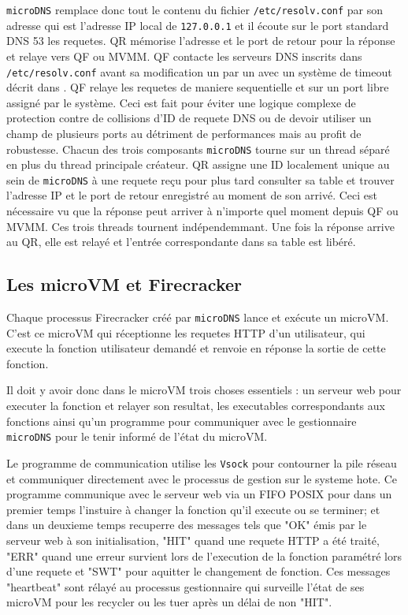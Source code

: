 \documentclass[12pt]{article}
\begin{document}
\texttt{microDNS} remplace donc tout le contenu du fichier \texttt{/etc/resolv.conf} par son adresse qui est l'adresse IP local de \texttt{127.0.0.1} et il écoute sur le port standard DNS 53 les requetes. QR mémorise l'adresse et le port de retour pour la réponse et relaye vers QF ou MVMM. QF contacte les serveurs DNS inscrits dans \texttt{/etc/resolv.conf} avant sa modification un par un avec un système de timeout décrit dans . QF relaye les requetes de maniere sequentielle et sur un port libre assigné par le système. Ceci est fait pour éviter une logique complexe de protection contre de collisions d'ID de requete DNS ou de devoir utiliser un champ de plusieurs ports au détriment de performances mais au profit de robustesse. Chacun des trois composants \texttt{microDNS} tourne sur un thread séparé en plus du thread principale créateur. QR assigne une ID localement unique au sein de \texttt{microDNS} à une requete reçu pour plus tard consulter sa table et trouver l'adresse IP et le port de retour enregistré au moment de son arrivé. Ceci est nécessaire vu que la réponse peut arriver à n'importe quel moment depuis QF ou MVMM. Ces trois threads tournent indépendemmant. Une fois la réponse arrive au QR, elle est relayé et l'entrée correspondante dans sa table est libéré.

\subsection{Les microVM et Firecracker}
Chaque processus Firecracker créé par \texttt{microDNS} lance et exécute un microVM. C'est ce microVM qui réceptionne les requetes HTTP d'un utilisateur, qui execute la fonction utilisateur demandé et renvoie en réponse la sortie de cette fonction.

Il doit y avoir donc dans le microVM trois choses essentiels : un serveur web pour executer la fonction et relayer son resultat, les executables correspondants aux fonctions ainsi qu'un programme pour communiquer avec le gestionnaire \texttt{microDNS} pour le tenir informé de l'état du microVM.

Le programme de communication utilise les \texttt{Vsock} pour contourner la pile réseau et communiquer directement avec le processus de gestion sur le systeme hote. Ce programme communique avec le serveur web via un FIFO POSIX pour dans un premier temps l'instuire à changer la fonction qu'il execute ou se terminer; et dans un deuxieme temps recuperre des messages tels que "OK" émis par le serveur web à son initialisation, "HIT" quand une requete HTTP a été traité, "ERR" quand une erreur survient lors de l'execution de la fonction paramétré lors d'une requete et "SWT" pour aquitter le changement de fonction. Ces messages "heartbeat" sont rélayé au processus gestionnaire qui surveille l'état de ses microVM pour les recycler ou les tuer après un délai de non "HIT".
\end{document}
